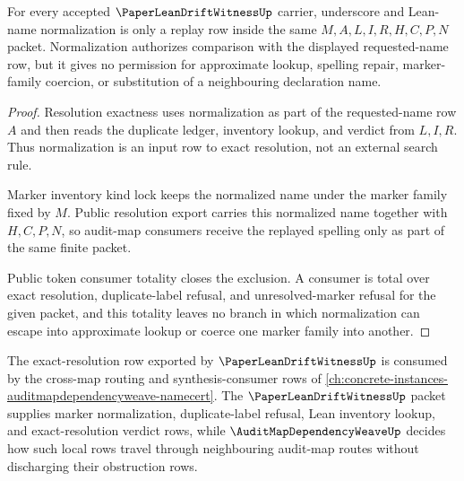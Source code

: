\begin{theorem}
\label{thm:paper-lean-drift-witness-name-normalization-noescape}
For every accepted $\PaperLeanDriftWitnessUp$ carrier, underscore and Lean-name normalization is only a replay row inside the same $M,A,L,I,R,H,C,P,N$ packet. Normalization authorizes comparison with the displayed requested-name row, but it gives no permission for approximate lookup, spelling repair, marker-family coercion, or substitution of a neighbouring declaration name.
\end{theorem}
\begin{proof}
Resolution exactness uses normalization as part of the requested-name row $A$ and then reads the duplicate ledger, inventory lookup, and verdict from $L,I,R$. Thus normalization is an input row to exact resolution, not an external search rule.

Marker inventory kind lock keeps the normalized name under the marker family fixed by $M$. Public resolution export carries this normalized name together with $H,C,P,N$, so audit-map consumers receive the replayed spelling only as part of the same finite packet.

Public token consumer totality closes the exclusion. A consumer is total over exact resolution, duplicate-label refusal, and unresolved-marker refusal for the given packet, and this totality leaves no branch in which normalization can escape into approximate lookup or coerce one marker family into another.
\end{proof}

The exact-resolution row exported by $\PaperLeanDriftWitnessUp$ is consumed by the cross-map routing and synthesis-consumer rows of \autoref{ch:concrete-instances-auditmapdependencyweave-namecert}. The $\PaperLeanDriftWitnessUp$ packet supplies marker normalization, duplicate-label refusal, Lean inventory lookup, and exact-resolution verdict rows, while $\AuditMapDependencyWeaveUp$ decides how such local rows travel through neighbouring audit-map routes without discharging their obstruction rows.


